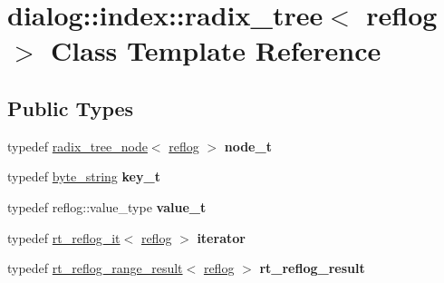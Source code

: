 \hypertarget{classdialog_1_1index_1_1radix__tree}{}\section{dialog\+:\+:index\+:\+:radix\+\_\+tree$<$ reflog $>$ Class Template Reference}
\label{classdialog_1_1index_1_1radix__tree}
\subsection*{Public Types}
\begin{DoxyCompactItemize}
\item 
\mbox{\label{classdialog_1_1index_1_1radix__tree_a4171083d914974526d788401cff4a769}} 
typedef \hyperlink{structdialog_1_1index_1_1radix__tree__node}{radix\+\_\+tree\+\_\+node}$<$ \hyperlink{classdialog_1_1monolog_1_1monolog__exp2__linear}{reflog} $>$ {\bfseries node\+\_\+t}
\item 
\mbox{\label{classdialog_1_1index_1_1radix__tree_a94d7e05cbfb067ca81642a059e45a868}} 
typedef \hyperlink{classdialog_1_1byte__string}{byte\+\_\+string} {\bfseries key\+\_\+t}
\item 
\mbox{\label{classdialog_1_1index_1_1radix__tree_a860158d542bb505c99068fff580e4a68}} 
typedef reflog\+::value\+\_\+type {\bfseries value\+\_\+t}
\item 
\mbox{\label{classdialog_1_1index_1_1radix__tree_a7d6bb45239ec553be699b648fd66b3a3}} 
typedef \hyperlink{classdialog_1_1index_1_1rt__reflog__it}{rt\+\_\+reflog\+\_\+it}$<$ \hyperlink{classdialog_1_1monolog_1_1monolog__exp2__linear}{reflog} $>$ {\bfseries iterator}
\item 
\mbox{\label{classdialog_1_1index_1_1radix__tree_a993d828a62dd13f42e4a324ab90d934e}} 
typedef \hyperlink{classdialog_1_1index_1_1rt__reflog__range__result}{rt\+\_\+reflog\+\_\+range\+\_\+result}$<$ \hyperlink{classdialog_1_1monolog_1_1monolog__exp2__linear}{reflog} $>$ {\bfseries rt\+\_\+reflog\+\_\+result}
\item 
\mbox{\label{classdialog_1_1index_1_1radix__tree_aa1adef4fed992b3ded3831a7180322d8}} 

\end{DoxyCompactItemize}

